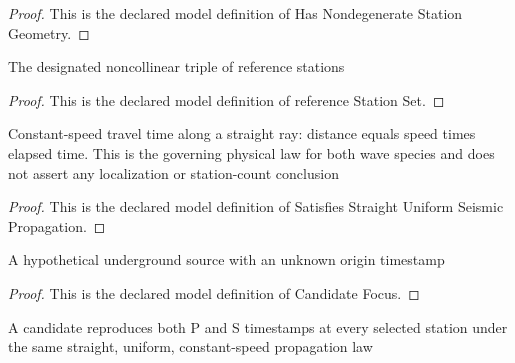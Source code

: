 \begin{proof}
  This is the declared model definition of Has Nondegenerate Station Geometry.
\end{proof}
\begin{definition}
  \label{def:physics:phyx-mini-0239:phyxminiproblems-problemphyxmini0239-referencestationset}
  The designated noncollinear triple of reference stations
\end{definition}
\begin{proof}
  This is the declared model definition of reference Station Set.
\end{proof}
\begin{definition}
  \label{def:physics:phyx-mini-0239:phyxminiproblems-problemphyxmini0239-satisfiesstraightuniformseismicpropagation}
  Constant-speed travel time along a straight ray: distance equals speed times elapsed time. This is the governing physical law for both wave species and does not assert any localization or station-count conclusion
\end{definition}
\begin{proof}
  This is the declared model definition of Satisfies Straight Uniform Seismic Propagation.
\end{proof}
\begin{definition}
  \label{def:physics:phyx-mini-0239:phyxminiproblems-problemphyxmini0239-candidatefocus}
  A hypothetical underground source with an unknown origin timestamp
\end{definition}
\begin{proof}
  This is the declared model definition of Candidate Focus.
\end{proof}
\begin{definition}
  \label{def:physics:phyx-mini-0239:phyxminiproblems-problemphyxmini0239-candidatefitsstationreadings}
  A candidate reproduces both P and S timestamps at every selected station under the same straight, uniform, constant-speed propagation law
\end{definition}
